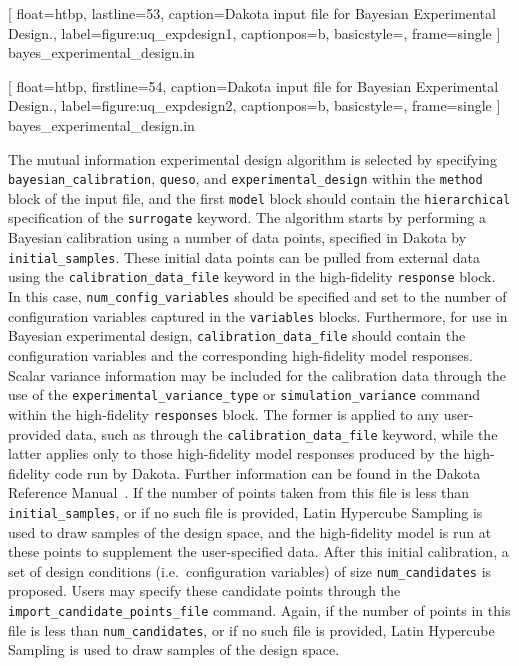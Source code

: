 \renewcommand{\thelstlisting}{\thechapter.\arabic{figure}}

[
float=htbp,
lastline=53,
caption={Dakota input file for Bayesian Experimental Design.}, 
label={figure:uq_expdesign1},
captionpos=b,
basicstyle=\small,
frame=single
]
{bayes_experimental_design.in}

[
float=htbp,
firstline=54,
caption={Dakota input file for Bayesian Experimental Design.}, 
label={figure:uq_expdesign2},
captionpos=b,
basicstyle=\small,
frame=single
]
{bayes_experimental_design.in}

The mutual information experimental design algorithm is selected by specifying 
\texttt{bayesian\_calibration}, \texttt{queso}, and 
\texttt{experimental\_design} within the \texttt{method} block of the input 
file, and the first \texttt{model} block should contain the 
\texttt{hierarchical} specification of the \texttt{surrogate} keyword. The 
algorithm starts by performing a Bayesian calibration using a number of data
points, specified in Dakota by \texttt{initial\_samples}. These initial data
points can be pulled from external data using the 
\texttt{calibration\_data\_file} keyword in the high-fidelity \texttt{response}
block. In this case, \texttt{num\_config\_variables} should be specified and 
set to the number of configuration variables captured in the \texttt{variables} 
blocks. Furthermore, for use in Bayesian experimental design, 
\texttt{calibration\_data\_file} should contain the configuration variables 
and the corresponding high-fidelity model responses. Scalar variance 
information may be included for the calibration data through the use of the 
\texttt{experimental\_variance\_type} or \texttt{simulation\_variance} command 
within the high-fidelity \texttt{responses} block. The former is applied to any 
user-provided data, such as through the \texttt{calibration\_data\_file} 
keyword, while the latter applies only to those high-fidelity model responses 
produced by the high-fidelity code run by Dakota. Further information can be 
found in the Dakota Reference Manual~\cite{RefMan}. If the number of points 
taken from this file is less than \texttt{initial\_samples}, or if no such 
file is provided, Latin Hypercube Sampling is used to draw samples of the 
design space, and the high-fidelity model is run at these points to supplement
the user-specified data. After this initial calibration, a set of design 
conditions (i.e.\ configuration variables) of size \texttt{num\_candidates} is 
proposed. Users may specify these candidate points through the 
\texttt{import\_candidate\_points\_file} command. Again, if the number of 
points in this file is less than \texttt{num\_candidates}, or if no such file 
is provided, Latin Hypercube Sampling is used to draw samples of the design 
space.  

